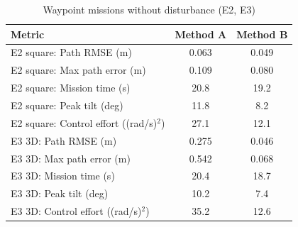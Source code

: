 \begin{table}[h]
\centering
\caption{Waypoint missions without disturbance (E2, E3)}
\label{tab:e2e3}
\begin{tabular}{|p{8.2cm}|c|c|}
\hline
\textbf{Metric} & \textbf{Method A} & \textbf{Method B} \\ \hline
E2 square: Path RMSE (m) & 0.063 & 0.049 \\ \hline
E2 square: Max path error (m) & 0.109 & 0.080 \\ \hline
E2 square: Mission time (s) & 20.8 & 19.2 \\ \hline
E2 square: Peak tilt (deg) & 11.8 & 8.2 \\ \hline
E2 square: Control effort ((rad/s)$^2$) & 27.1 & 12.1 \\ \hline
E3 3D: Path RMSE (m) & 0.275 & 0.046 \\ \hline
E3 3D: Max path error (m) & 0.542 & 0.068 \\ \hline
E3 3D: Mission time (s) & 20.4 & 18.7 \\ \hline
E3 3D: Peak tilt (deg) & 10.2 & 7.4 \\ \hline
E3 3D: Control effort ((rad/s)$^2$) & 35.2 & 12.6 \\ \hline
\end{tabular}
\end{table}
